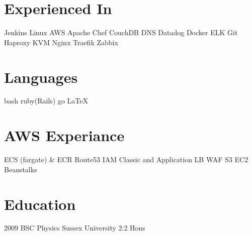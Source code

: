 \documentclass[]{friggeri-cv-a4}
\begin{document}
\fancyfoot{}

\begin{aside}
	\section{Experienced In}
		Jenkins
		Linux
    AWS
    Apache
    Chef
    CouchDB
    DNS
    Datadog
    Docker
    ELK
    Git
    Haproxy
    KVM
    Nginx
    Traefik
    Zabbix
  \section{Languages}
    bash
		ruby(Rails)
    go
    \LaTeX
  \section{AWS Experiance}
    ECS (fargate) \& ECR
    Route53
    IAM
    Classic and Application LB
    WAF
    S3
    EC2
    Beanstalks
  \section{Education}
    2009 BSC Physics Sussex University 2:2 Hons
\end{aside}
\end{document}
